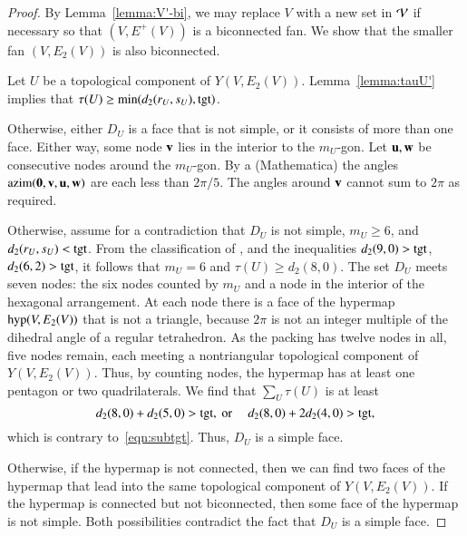 \documentclass{llncs}
\def\op#1{{\hbox{#1}}}
\begin{document}
\begin{proof}
  By Lemma~\ref{lemma:V'-bi}, we may replace $V$ with a new set in
  ${\mathcal V}$ if necessary so that $(V,E^+(V))$ is a biconnected fan.
   We  show that the smaller
  fan $(V,E_2(V))$ is also biconnected.

  Let $U$ be a topological component of $Y(V,E_2(V))$.  Lemma~\ref{lemma:tauU'}
   implies that $\tau(U)\ge \min(d_2(r_U,s_U),\op{tgt})$.

    Otherwise,
   either $D_U$ is a face that is not simple, or it consists of more than
   one face.  Either way, some node ${\mathbf v}$ lies in the interior to the
   $m_U$-gon.  Let ${\mathbf u},{\mathbf w}$ be consecutive nodes around the $m_U$-gon.
   By a %
  {(Mathematica)} the angles
   $\op{azim}(\orz,\v,\u,\w)$ are each less than $2\pi/5$. The angles
   around ${\mathbf v}$ cannot sum to $2\pi$ as required.

     Otherwise, assume
   for a contradiction that $D_U$ is not simple, $m_U\ge 6$, and
   $d_2(r_U,s_U)<\op{tgt}$.  From the classification of
   \cite[p.~126,~Fig.~12.1]{Hales:2006:DCG}, and the inequalities
   $d_2(9,0) > \op{tgt}$, $d_2(6,2) > \op{tgt}$, it follows that 
    $m_U=6$ and $\tau(U)\ge d_2(8,0)$.  The set $D_U$ meets seven
   nodes: the six nodes counted by $m_U$ and a node in the interior of
   the hexagonal arrangement.  At each node there is a face of the
   hypermap $\op{hyp}(V,E_2(V))$ that is not a triangle, because
   $2\pi$ is not an integer multiple of the dihedral angle of a
   regular tetrahedron.  As the packing has twelve nodes in all, five
   nodes remain, each meeting a nontriangular topological component of
   $Y(V,E_2(V))$.  Thus, by counting nodes, the hypermap has at least
   one pentagon or two quadrilaterals.  We find that $\sum_{U}
   \tau(U)$ is at least
\[
d_2(8,0) + d_2(5,0) > \op{tgt}, \text{ or }\quad d_2(8,0) + 2 d_2(4,0) > \op{tgt},
\]
which is contrary to~\eqref{eqn:subtgt}.
Thus, $D_U$ is a simple face.
%
%

  Otherwise, if the hypermap is
not connected, then we can find two faces of the hypermap that lead
into the same topological component of $Y(V,E_2(V))$.  If the
hypermap is connected but not biconnected, then some face of the
hypermap is not simple.  Both possibilities contradict the fact that
$D_U$ is a simple face.
\end{proof}
\end{document}
